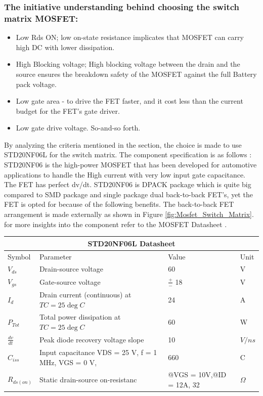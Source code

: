 \subsubsection{The initiative understanding behind choosing the switch matrix MOSFET:}
\begin{itemize}
    \item Low Rds ON; low on-state resistance implicates that MOSFET can carry high DC with lower dissipation.
    \item High Blocking voltage; High blocking voltage between the drain and the source ensures the breakdown safety of the MOSFET against the full Battery pack voltage.
    \item Low gate area - to drive the FET faster, and it cost less than the current budget for the FET's gate driver.
    \item Low gate drive voltage. So-and-so forth.
\end{itemize}

\noindent By analyzing the criteria mentioned in the section, the choice is made to use STD20NF06L for the switch matrix. The component specification is as follows :
STD20NF06\cite{Switch_MatrixFET_STD20NF06L} is the high-power MOSFET that has been developed for automotive applications to handle the High current with very low input gate capacitance. The FET has perfect dv/dt. STD20NF06 is DPACK package which is quite big compared to SMD package and single package dual back-to-back FET's, yet the FET is opted for because of the following benefits. The back-to-back FET arrangement is made externally as shown in Figure \ref{fig:Mosfet_Switch_Matrix}.
for more insights into the component refer to the MOSFET Datasheet \cite{Switch_MatrixFET_STD20NF06L}.
	


\begin{center}
\begin{tabular}{ |p{4cm}|p{4cm}|p{4cm}|p{4cm}|  }
\hline
\multicolumn{4}{|c|}{STD20NF06L Datasheet} \\
\hline
Symbol& Parameter &Value & Unit \\
\hline
$V_{ds}$  & Drain-source voltage & 60 & V \\
$V_{gs}$  & Gate-source voltage  & $\frac{+}{-}$ 18 & V \\
$I_{d}$   & Drain current (continuous) at $ TC = 25 \deg C$ & 24 & A \\
$P_{Tot}$ & Total power dissipation at $ TC = 25 \deg C$    & 60 & W \\
$\frac{dv}{dt}$ & Peak diode recovery voltage slope    & 10 & $V/ns$ \\
$C_{iss}$ & Input capacitance VDS = 25 V, f = 1 MHz, VGS = 0 V, & 660 & C \\
$R_{ds(on)}$ & Static drain-source on-resistanc & @VGS = 10V,@ID = 12A, 32  & $\Omega$ \\
\hline
\end{tabular}
\end{center}